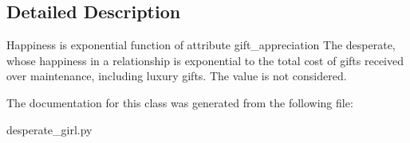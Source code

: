 \subsection{Detailed Description}
\begin{DoxyVerb}Happiness is exponential function of attribute gift_appreciation
The desperate, whose happiness in a relationship is exponential to the total cost of gifts received over maintenance, including luxury gifts. The value is not considered.
\end{DoxyVerb}
 

The documentation for this class was generated from the following file\+:\begin{DoxyCompactItemize}
\item 
desperate\+\_\+girl.\+py\end{DoxyCompactItemize}
